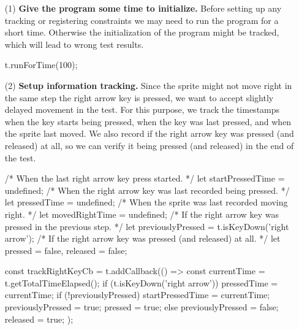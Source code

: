 \begin{enumerate}
    \item[(1)] \textbf{Give the program some time to initialize.}
        Before setting up any tracking or registering constraints we may need to run the program for a short time.
        Otherwise the initialization of the program might be tracked, which will lead to wrong test results.
        \begin{javascriptcode}
            t.runForTime(100);
        \end{javascriptcode}
    \item[(2)] \textbf{Setup information tracking.}
        Since the sprite might not move right in the same step the right arrow key is pressed,
        we want to accept slightly delayed movement in the test.
        For this purpose, we track the timestamps when the key starts being pressed,
        when the key was last pressed, and when the sprite last moved.
        We also record if the right arrow key was pressed (and released) at all,
        so we can verify it being pressed (and released) in the end of the test.
        \begin{javascriptcode}
            /* When the last right arrow key press started. */
            let startPressedTime = undefined;
            /* When the right arrow key was last recorded being pressed. */
            let pressedTime = undefined;
            /* When the sprite was last recorded moving right. */
            let movedRightTime = undefined;
            /* If the right arrow key was pressed in the previous step. */
            let previouslyPressed = t.isKeyDown('right arrow');
            /* If the right arrow key was pressed (and released) at all. */
            let pressed = false, released = false;

            const trackRightKeyCb = t.addCallback(() => {
                const currentTime = t.getTotalTimeElapsed();
                if (t.isKeyDown('right arrow')) {
                    pressedTime = currentTime;
                    if (!previouslyPressed) {
                        startPressedTime = currentTime;
                    }
                    previouslyPressed = true;
                    pressed = true;
                } else {
                    previouslyPressed = false;
                    released = true;
                }
            });


\end{javascriptcode}
\end{enumerate}
